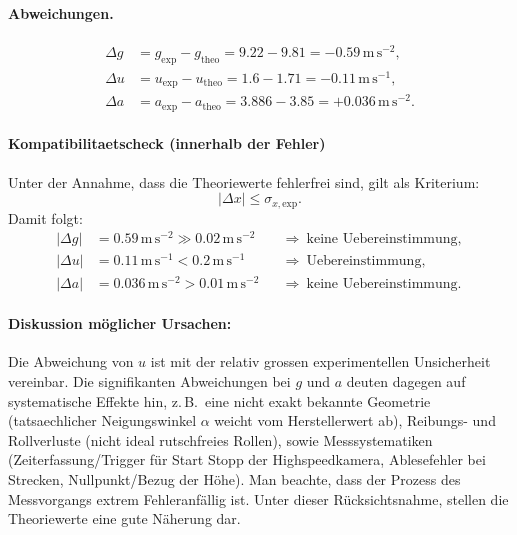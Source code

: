 \documentclass{article}
\begin{document}
\paragraph{Abweichungen.}
\begin{align}
\Delta g &= g_\mathrm{exp}-g_\mathrm{theo} = 9.22-9.81 = -0.59\,\mathrm{m\,s^{-2}},\\
\Delta u &= u_\mathrm{exp}-u_\mathrm{theo} = 1.6-1.71 = -0.11\,\mathrm{m\,s^{-1}},\\
\Delta a &= a_\mathrm{exp}-a_\mathrm{theo} = 3.886-3.85 = +0.036\,\mathrm{m\,s^{-2}}.
\end{align}

\paragraph{Kompatibilitaetscheck (innerhalb der Fehler)}
Unter der Annahme, dass die Theoriewerte fehlerfrei sind, gilt als Kriterium:
\begin{equation}
|\Delta x| \le \sigma_{x,\mathrm{exp}}.
\end{equation}
Damit folgt:
\begin{align}
|\Delta g| &= 0.59\,\mathrm{m\,s^{-2}} \gg 0.02\,\mathrm{m\,s^{-2}}
&&\Rightarrow\ \text{keine Uebereinstimmung},\\
|\Delta u| &= 0.11\,\mathrm{m\,s^{-1}} < 0.2\,\mathrm{m\,s^{-1}}
&&\Rightarrow\ \text{Uebereinstimmung},\\
|\Delta a| &= 0.036\,\mathrm{m\,s^{-2}} > 0.01\,\mathrm{m\,s^{-2}}
&&\Rightarrow\ \text{keine Uebereinstimmung}.
\end{align}

\paragraph{Diskussion möglicher Ursachen:}
Die Abweichung von $u$ ist mit der relativ grossen experimentellen Unsicherheit vereinbar.
Die signifikanten Abweichungen bei $g$ und $a$ deuten dagegen auf systematische Effekte hin,
z.\,B.\ eine nicht exakt bekannte Geometrie (tatsaechlicher Neigungswinkel $\alpha$ weicht vom Herstellerwert ab),
Reibungs- und Rollverluste (nicht ideal rutschfreies Rollen), sowie Messsystematiken
(Zeiterfassung/Trigger für Start Stopp der Highspeedkamera, Ablesefehler bei Strecken, Nullpunkt/Bezug der Höhe). Man beachte, dass der Prozess des Messvorgangs extrem Fehleranfällig ist. Unter dieser Rücksichtsnahme, stellen die Theoriewerte eine gute Näherung dar.
\end{document}
